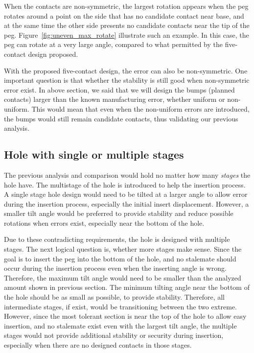 \documentclass[11pt, twocolumn]{article}
\begin{document}
When the contacts are non-symmetric, the largest rotation appears when the peg rotates around a point on the side that has no candidate contact near base, and at the same time the other side presents no candidate contacts near the tip of the peg. Figure~\ref{fig:uneven_max_rotate} illustrate such an example. In this case, the peg can rotate at a very large angle, compared to what permitted by the five-contact design proposed. 

With the proposed five-contact design, the error can also be non-symmetric. One important question is that whether the stability is still good when non-symmetric error exist. In above section, we said that we will design the bumps (planned contacts) larger than the known manufacturing error, whether uniform or non-uniform. This would mean that even when the non-uniform errors are introduced, the bumps would still remain candidate contacts, thus validating our previous analysis. 

\subsection{Hole with single or multiple stages}


The previous analysis and comparison would hold no matter how many {\em stages} the hole have. The multistage of the hole is introduced to help the insertion process. A single stage hole design would need to be tilted at a larger angle to allow error during the insertion process, especially the initial insert displacement. However, a smaller tilt angle would be preferred to provide stability and reduce possible rotations when errors exist, especially near the bottom of the hole. 

Due to these contradicting requirements, the hole is designed with multiple stages. The next logical question is, whether more stages make sense. Since the goal is to insert the peg into the bottom of the hole, and no stalemate should occur during the insertion process even when the inserting angle is wrong. Therefore, the maximum tilt angle would need to be smaller than the analyzed amount shown in previous section. The minimum tilting angle near the bottom of the hole should be as small as possible, to provide stability. Therefore, all intermediate stages, if exist, would be transitioning between the two extreme. However, since the most tolerant section is near the top of the hole to allow easy insertion, and no stalemate exist even with the largest tilt angle, the multiple stages would not provide additional stability or security during insertion, especially when there are no designed contacts in those stages. 
\end{document}

